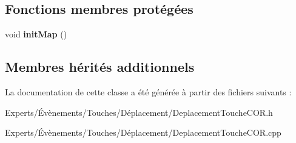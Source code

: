 \subsection*{Fonctions membres protégées}
\begin{DoxyCompactItemize}
\item 
\mbox{\label{class_deplacement_touche_c_o_r_a6b41e878f5390ee9dc0829a85486dd62}} 
void {\bfseries init\+Map} ()
\end{DoxyCompactItemize}
\subsection*{Membres hérités additionnels}


La documentation de cette classe a été générée à partir des fichiers suivants \+:\begin{DoxyCompactItemize}
\item 
Experts/Évènements/\+Touches/\+Déplacement/Deplacement\+Touche\+C\+O\+R.\+h\item 
Experts/Évènements/\+Touches/\+Déplacement/Deplacement\+Touche\+C\+O\+R.\+cpp\end{DoxyCompactItemize}
